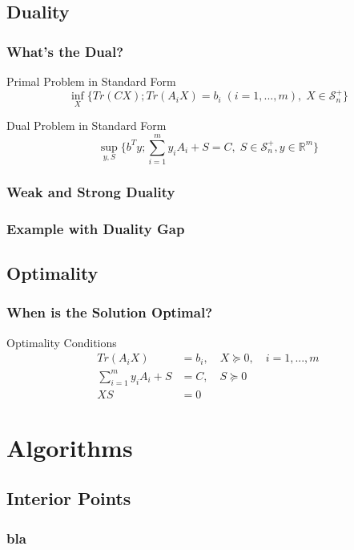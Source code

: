 \documentclass[11pt]{beamer}
\begin{document}
\subsection{Duality}
	\begin{frame}
		\frametitle{What's the Dual?}
		\begin{block}{Primal Problem in Standard Form}
			\begin{equation}
			\inf_X\{Tr(CX);Tr(A_iX)=b_i\;(i=1,...,m),\;X\in \mathcal{S}^+_n\}
			\end{equation}
		\end{block}
		\begin{block}{Dual Problem in Standard Form}
			\begin{equation}
			\sup_{y,S}\{b^Ty;\sum_{i=1}^{m}y_iA_i+S=C,\;S\in \mathcal{S}^+_n,y\in\mathbb{R}^m\}
			\end{equation}
		\end{block}
	\end{frame}
	\begin{frame}
		\frametitle{Weak and Strong Duality}
	\end{frame}
	\begin{frame}
		\frametitle{Example with Duality Gap}
	\end{frame}
\subsection{Optimality}
	\begin{frame}
		\frametitle{When is the Solution Optimal?}
		\begin{block}{Optimality Conditions}
			\begin{equation*}
			\begin{aligned}
			Tr(A_iX)&=b_i,\quad X\succeq 0,\quad i=1,...,m\\
			\sum_{i=1}^{m}y_iA_i+S&=C,\quad S\succeq 0\\
			XS&=0
			\end{aligned}
			\end{equation*}
		\end{block}
	\end{frame}
\section{Algorithms}
\subsection{Interior Points}
\begin{frame}
	\frametitle{bla}
\end{frame}
\end{document}
